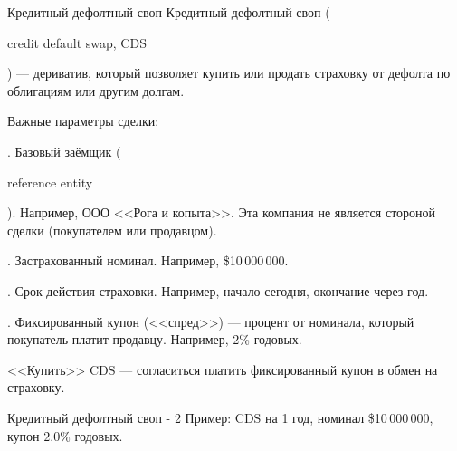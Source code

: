 \documentclass{beamer}
\newcommand{\en}[1]{\begin{otherlanguage}{english}#1\end{otherlanguage}}
\begin{document}
\begin{frame}{Кредитный дефолтный своп}
\justify
\alert{Кредитный дефолтный своп} (\en{credit default swap, CDS}) --- дериватив, который позволяет купить или продать страховку от дефолта по облигациям или другим долгам.

\justify
Важные параметры сделки:

. Базовый заёмщик (\en{reference entity}). Например, ООО <<Рога и копыта>>. Эта компания не является стороной сделки (покупателем или продавцом).

. Застрахованный номинал. Например, \$10\,000\,000.

. Срок действия страховки. Например, начало сегодня, окончание через год.

. Фиксированный купон (<<спред>>) --- процент от номинала, который покупатель платит продавцу. Например, 2\% годовых.

\justify
<<Купить>> CDS --- согласиться платить фиксированный купон в обмен на страховку.
\end{frame}



\newcommand{\swapPartyNode}[5]{

	\draw (#1, #2)
		node[
			rectangle,
			draw,
			rounded corners,
			anchor = south,
			minimum height = 0.8cm,
			minimum width = 2.5cm
		]
		{#5}
	--
	(#3, #4);
}

\newcommand{\swapBuyerPaymentEx}[7]{

	\draw [
		->,
		>=triangle 90
	] 
	(#1, #2)
	node[
		label = left:{#7}
	]{}
	-- (#3, #4)
	node[
		pos=0.5,
		anchor=south
	]
	{#5}
	node[
		pos=0.5,
		anchor=north
	]
	{#6};
}

\newcommand{\swapBuyerPayment}[6]{

	\swapBuyerPaymentEx{#1}{#2}{#3}{#4}{#5}{}{#6}
}

\begin{frame}{Кредитный дефолтный своп - 2}
\justify
Пример: CDS на 1 год, номинал \$10\,000\,000, купон $2.0\%$ годовых.

\justify
\centering
{}
\end{frame}
\end{document}
